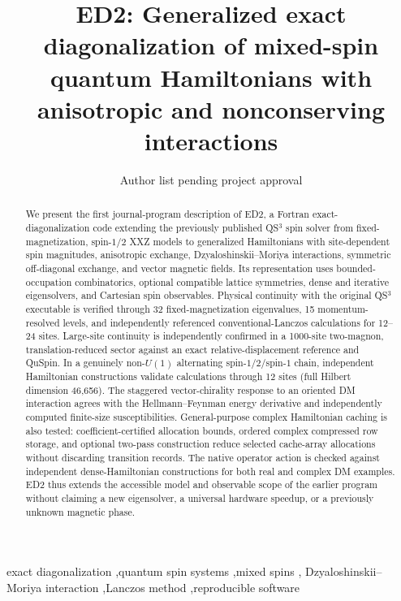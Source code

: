 \documentclass[preprint,12pt,nopreprintline]{elsarticle}
\begin{document}
\begin{frontmatter}
\title{ED2: Generalized exact diagonalization of mixed-spin quantum Hamiltonians with anisotropic and nonconserving interactions}
\author[aff]{Author list pending project approval}
\address[aff]{Affiliations to be confirmed before submission}
\begin{abstract}
We present the first journal-program description of ED2, a Fortran
exact-diagonalization code extending the previously published QS$^3$
spin solver from fixed-magnetization, spin-$1/2$ XXZ models to
generalized Hamiltonians with site-dependent spin magnitudes, anisotropic
exchange, Dzyaloshinskii--Moriya interactions, symmetric off-diagonal
exchange, and vector magnetic fields. Its representation uses
bounded-occupation combinatorics, optional compatible lattice symmetries,
dense and iterative eigensolvers, and Cartesian spin observables.
Physical continuity with the original QS$^3$ executable is verified
through 32 fixed-magnetization eigenvalues, 15 momentum-resolved levels,
and independently referenced conventional-Lanczos calculations for
12--24 sites. Large-site continuity is independently confirmed in a
1000-site two-magnon, translation-reduced sector against an exact
relative-displacement reference and QuSpin. In a genuinely non-$U(1)$ alternating spin-$1/2$/spin-$1$
chain, independent Hamiltonian constructions validate calculations
through 12 sites (full Hilbert dimension 46,656).
The staggered vector-chirality response to an oriented DM interaction
agrees with the Hellmann--Feynman energy derivative and independently
computed finite-size susceptibilities. General-purpose complex Hamiltonian caching is also tested:
coefficient-certified allocation bounds, ordered complex compressed
row storage, and optional two-pass construction reduce selected
cache-array allocations without discarding transition records.
The native operator action is checked against independent
dense-Hamiltonian constructions for both real and complex DM examples.
ED2 thus extends the accessible model and observable scope of
the earlier program without claiming a new eigensolver,
a universal hardware speedup, or a previously unknown magnetic phase.
\end{abstract}
\begin{keyword}
exact diagonalization \sep quantum spin systems \sep mixed spins \sep
Dzyaloshinskii--Moriya interaction \sep Lanczos method \sep reproducible software
\end{keyword}
\end{frontmatter}
\end{document}
